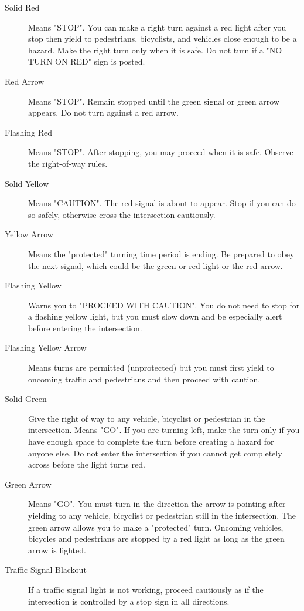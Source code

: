 \begin{description}
\item[Solid Red]
Means "STOP".
You can make a right turn against a red light after you stop then yield to
pedestrians, bicyclists, and vehicles close enough to be a hazard.
Make the right turn only when it is safe.
Do not turn if a "NO TURN ON RED" sign is posted.

\item[Red Arrow]
Means "STOP".
Remain stopped until the green signal or green arrow appears.
Do not turn against a red arrow.

\item[Flashing Red]
Means "STOP".
After stopping, you may proceed when it is safe.
Observe the right-of-way rules.

\item[Solid Yellow]
Means "CAUTION".
The red signal is about to appear.
Stop if you can do so safely, otherwise cross the intersection cautiously.

\item[Yellow Arrow]
Means the "protected" turning time period is ending.
Be prepared to obey the next signal,
which could be the green or red light or the red arrow.

\item[Flashing Yellow]
Warns you to "PROCEED WITH CAUTION".
You do not need to stop for a flashing yellow light,
but you must slow down and be especially alert
before entering the intersection.

\item[Flashing Yellow Arrow]
Means turns are permitted (unprotected)
but you must first yield to oncoming traffic and pedestrians
and then proceed with caution.

\item[Solid Green]
Give the right of way to any
vehicle, bicyclist or pedestrian in the intersection.
Means "GO".
If you are turning left, make the turn
only if you have enough space to complete the turn
before creating a hazard for anyone else.
Do not enter the intersection if you cannot get completely across
before the light turns red.

\item[Green Arrow]
Means "GO".
You must turn in the direction the arrow is pointing after yielding to any
vehicle, bicyclist or pedestrian still in the intersection.
The green arrow allows you to make a "protected" turn.
Oncoming vehicles, bicycles and pedestrians are stopped by a red light
as long as the green arrow is lighted.

\item[Traffic Signal Blackout]
If a traffic signal light is not working, proceed cautiously
as if the intersection is controlled by a stop sign in all directions.
\end{description}

